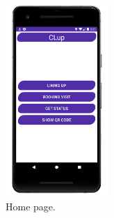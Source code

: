 \begin{figure}[H]
	\centering
	\includegraphics[width=0.35\textwidth]{images/home.png}
	\caption{Home page.}
	\label{customersUseCasesDiagram}
\end{figure}

